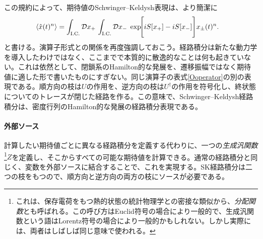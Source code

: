 \documentclass[a4paper,11pt,oneside]{article}
\theoremstyle{definition}
\numberwithin{equation}{section}
\newcommand{\ex}[1]{\langle #1 \rangle}
\begin{document}
この規約によって、期待値のSchwinger--Keldysh表現は、より簡潔に
\begin{align}\label{Zhere}
\ex{\hat x(t)^{n}}
&=
\int_{\rm I.C.}\mathcal D x_+\,
\int_{\rm I.C.}\mathcal D x_-\;
\exp\!\Biggl[
iS[x_+] - iS[x_-] \Biggr] x_{\pm}(t)^{n}.
\end{align}
と書ける。演算子形式との関係を再度強調しておこう。経路積分は新たな動力学を導入したわけではなく、ここまでで本質的に散逸的なことは何も起きていない。これは依然として、閉鎖系のHamilton的な発展を、遷移振幅ではなく期待値に適した形で書いたものにすぎない。同じ演算子の表式\eqref{Ooperator}の別の表現である。順方向の枝は$U$の作用を、逆方向の枝は$U^\dagger$の作用を符号化し、終状態についてのトレースが閉じた経路を作る。この意味で、Schwinger--Keldysh経路積分は、密度行列のHamilton的な発展の経路積分表現である。








\paragraph{外部ソース} 計算したい期待値ごとに異なる経路積分を定義する代わりに、一つの\textit{生成汎関数}\footnote{これは、保存電荷をもつ熱的状態の統計物理学との密接な類似から、\textit{分配関数}とも呼ばれる。この呼び方はEuclid符号の場合により一般的で、生成汎関数という語はLorentz符号の場合により一般的かもしれない。しかし実際には、両者はしばしば同じ意味で使われる。}$ Z$を定義し、そこからすべての可能な期待値を計算できる。通常の経路積分と同じく、変数を外部ソースに結合することで、これを実現する。SK経路積分は二つの枝をもつので、順方向と逆方向の両方の枝にソースが必要である。
\end{document}
